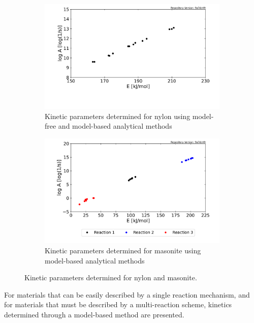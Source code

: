 \documentclass[12pt,oneside]{book}
\begin{document}
\begin{figure}[H]
    \centering
    \begin{subfigure}[b]{0.475\textwidth}
        \centering
        \includegraphics[width=\textwidth]{Figures/Nylon_kinetics.pdf}
        \caption{Kinetic parameters determined for nylon using model-free and model-based analytical methods}
    \end{subfigure}
    \hfill
    \begin{subfigure}[b]{0.475\textwidth}
        \centering
        \includegraphics[width=\textwidth]{Figures/Masonite_board_kinetics.pdf}
        \caption{Kinetic parameters determined for masonite using model-based analytical methods}
    \end{subfigure}
    \caption[Kinetic Parameters Determined for Nylon and Masonite] {Kinetic parameters determined for nylon and masonite.} 
    \label{fig:kinetics}
\end{figure}

For materials that can be easily described by a single reaction mechanism, and for materials that must be described by a multi-reaction scheme, kinetics determined through a model-based method are presented.
\end{document}
